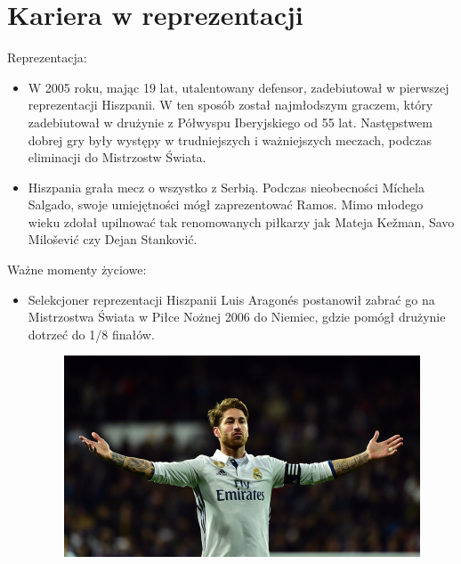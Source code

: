\documentclass{beamer}
\begin{document}
\section{Kariera w reprezentacji}
\begin{frame}{Reprezentacja:}
\begin{itemize}

\item<1>W 2005 roku, mając 19 lat, utalentowany defensor, zadebiutował w pierwszej reprezentacji Hiszpanii. W ten sposób został najmłodszym graczem, który zadebiutował w drużynie z Półwyspu Iberyjskiego od 55 lat. Następstwem dobrej gry były występy w trudniejszych i ważniejszych meczach, podczas eliminacji do Mistrzostw Świata.
\item<2>Hiszpania grała mecz o wszystko z Serbią. Podczas nieobecności Míchela Salgado, swoje umiejętności mógł zaprezentować Ramos. Mimo młodego wieku zdołał upilnować tak renomowanych piłkarzy jak Mateja Kežman, Savo Milošević czy Dejan Stanković.
\end{itemize}
\end{frame}

\begin{frame}{Ważne momenty życiowe:}
\begin{itemize}
\item{Selekcjoner reprezentacji Hiszpanii Luis Aragonés postanowił zabrać go na Mistrzostwa Świata w Piłce Nożnej 2006 do Niemiec, gdzie pomógł drużynie dotrzeć do 1/8 finałów.
\begin{figure}
\includegraphics[width=0.5\hsize] {ss.jpg}
\label{fig:ss}
\end{figure}
}
\end{itemize}
\end{frame}
\end{document}
